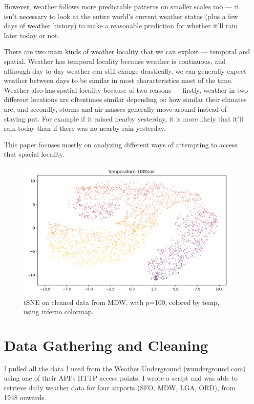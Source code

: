 \documentclass[a4paper]{article}
\begin{document}
However, weather follows more predictable patterns on smaller scales too --- it isn't necessary to look at the entire world's current weather status (plus a few days of weather history) to make a reasonable prediction for whether it'll rain later today or not. 

There are two main kinds of weather locality that we can exploit --- temporal and spatial. Weather has temporal locality because weather is continuous, and although day-to-day weather can still change drastically, we can generally expect weather between days to be similar in most characteristics most of the time. Weather also has spatial locality because of two reasons --- firstly, weather in two different locations are oftentimes similar depending on how similar their climates are, and secondly, storms and air masses generally move around instead of staying put. For example if it rained nearby yesterday, it is more likely that it'll rain today than if there was no nearby rain yesterday. 

This paper focuses mostly on analyzing different ways of attempting to access that spacial locality.

\begin{figure}[t]
  \centering
  \includegraphics[width=\linewidth]{../png/vis/temperature-100tsne.png}
  \caption{tSNE on cleaned data from MDW, with p=100, colored by temp, using inferno colormap.}
  \label{fig:15tsne_temp}
\end{figure}


\section{Data Gathering and Cleaning}

I pulled all the data I used from the Weather Underground (wunderground.com) using one of their API's HTTP access points. I wrote a script and was able to retrieve daily weather data for four airports (SFO, MDW, LGA, ORD), from 1948 onwards. 
\end{document}
